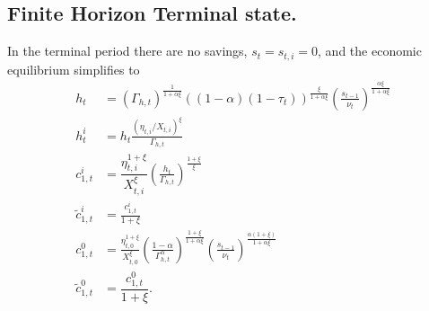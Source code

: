 \subsection{Finite Horizon Terminal state.}\label{\refsec:finitehorizon}

In the terminal period there are no savings, $s_t = s_{t,i} = 0$, and the economic equilibrium simplifies to
\begin{subequations}\label{\refeq:TerminalEE}
\begin{align}
    h_t &= \left(\Gamma_{h,t}\right)^{\frac{1}{1+\alpha\xi}}\left((1-\alpha)(1-\tau_t)\right)^{\frac{\xi}{1+\alpha\xi}}\left(\frac{s_{t-1}}{\nu_t}\right)^{\frac{\alpha\xi}{1+\alpha\xi}} \\
    h_t^i &= h_t\frac{(\eta_{t,i}/X_{t,i})^{\xi}}{\Gamma_{h,t}} \\
    c_{1,t}^i &= \dfrac{\eta_{t,i}^{1+\xi}}{X_{t,i}^{\xi}}\left(\frac{h_t}{\Gamma_{h,t}}\right)^{\frac{1+\xi}{\xi}} \\
    \tilde{c}_{1,t}^i &= \frac{c_{1,t}^i}{1+\xi} \\
    c_{1,t}^0 &= \frac{\eta_{t,0}^{1+\xi}}{X_{t,0}^{\xi}}\left(\frac{1-\alpha}{\Gamma_{h,t}^{\alpha}}\right)^{\frac{1+\xi}{1+\alpha\xi}}\left(\frac{s_{t-1}}{\nu_t}\right)^{\frac{\alpha(1+\xi)}{1+\alpha\xi}} \\
    \tilde{c}_{1,t}^0 &= \dfrac{c_{1,t}^0}{1+\xi}.
\end{align}
\end{subequations}

